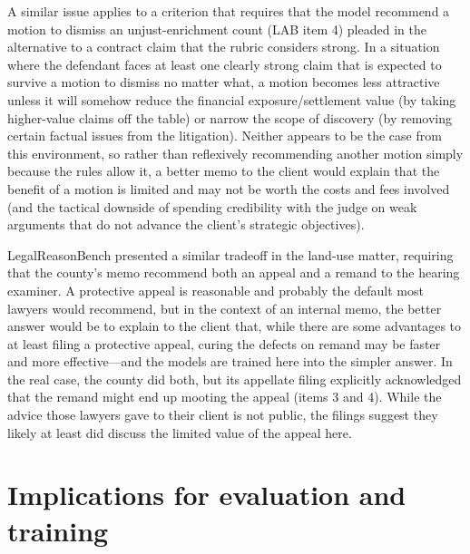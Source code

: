 \documentclass[11pt]{article}
\begin{document}
A similar issue applies to a criterion that requires that the model recommend a motion to dismiss an unjust-enrichment count (LAB item 4) pleaded in the alternative to a contract claim that the rubric considers strong. In a situation where the defendant faces at least one clearly strong claim that is expected to survive a motion to dismiss no matter what, a motion becomes less attractive unless it will somehow reduce the financial exposure/settlement value (by taking higher-value claims off the table) or narrow the scope of discovery (by removing certain factual issues from the litigation). Neither appears to be the case from this environment, so rather than reflexively recommending another motion simply because the rules allow it, a better memo to the client would explain that the benefit of a motion is limited and may not be worth the costs and fees involved (and the tactical downside of spending credibility with the judge on weak arguments that do not advance the client's strategic objectives).

LegalReasonBench presented a similar tradeoff in the land-use matter, requiring that the county's memo recommend both an appeal and a remand to the hearing examiner. A protective appeal is reasonable and probably the default most lawyers would recommend, but in the context of an internal memo, the better answer would be to explain to the client that, while there are some advantages to at least filing a protective appeal, curing the defects on remand may be faster and more effective---and the models are trained here into the simpler answer. In the real case, the county did both, but its appellate filing explicitly acknowledged that the remand might end up mooting the appeal (items 3 and 4). While the advice those lawyers gave to their client is not public, the filings suggest they likely at least did discuss the limited value of the appeal here.

\section{Implications for evaluation and training}
\label{sec:implications}
\end{document}
